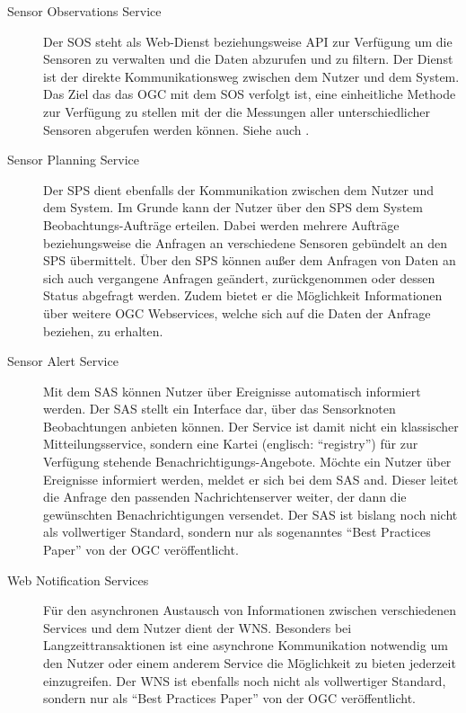 \begin{description}
\item[Sensor Observations Service] Der \gls{SOS} steht als Web-Dienst beziehungsweise \gls{API} zur Verfügung um die Sensoren zu verwalten und die Daten abzurufen und zu filtern. Der Dienst ist der direkte Kommunikationsweg zwischen dem Nutzer und dem System. Das Ziel das das \gls{OGC} mit dem \gls{SOS} verfolgt ist, eine einheitliche Methode zur Verfügung zu stellen mit der die Messungen aller unterschiedlicher Sensoren abgerufen werden können. Siehe auch \citep{na_sensor_2007}.
\item[Sensor Planning Service] Der \gls{SPS} dient ebenfalls der Kommunikation zwischen dem Nutzer und dem System. Im Grunde kann der Nutzer über den \gls{SPS} dem System Beobachtungs-Aufträge erteilen. Dabei werden mehrere Aufträge beziehungsweise die Anfragen an verschiedene Sensoren gebündelt an den \gls{SPS} übermittelt. Über den \gls{SPS} können außer dem Anfragen von Daten an sich auch vergangene Anfragen geändert, zurückgenommen oder dessen Status abgefragt werden. Zudem bietet er die Möglichkeit Informationen über weitere \gls{OGC} Webservices, welche sich auf die Daten der Anfrage beziehen, zu erhalten.
\item[Sensor Alert Service] Mit dem \gls{SAS} können Nutzer über Ereignisse automatisch informiert werden. Der \gls{SAS} stellt ein Interface dar, über das Sensorknoten Beobachtungen anbieten können. Der Service ist damit nicht ein klassischer Mitteilungsservice, sondern eine Kartei (englisch: ``registry'') für zur Verfügung stehende Benachrichtigungs-Angebote. Möchte ein Nutzer über Ereignisse informiert werden, meldet er sich bei dem \gls{SAS} and. Dieser leitet die Anfrage den passenden Nachrichtenserver weiter, der dann die gewünschten Benachrichtigungen versendet.  Der \gls{SAS} ist bislang noch nicht als vollwertiger Standard, sondern nur als sogenanntes ``Best Practices Paper'' von der \gls{OGC} veröffentlicht.
\item[Web Notification Services] Für den asynchronen Austausch von Informationen zwischen verschiedenen Services und dem Nutzer dient der \gls{WNS}. Besonders bei Langzeittransaktionen ist eine asynchrone Kommunikation notwendig um den Nutzer oder einem anderem Service die Möglichkeit zu bieten jederzeit einzugreifen. Der \gls{WNS} ist ebenfalls noch nicht als vollwertiger Standard, sondern nur als ``Best Practices Paper'' von der \gls{OGC} veröffentlicht.
\end{description}

